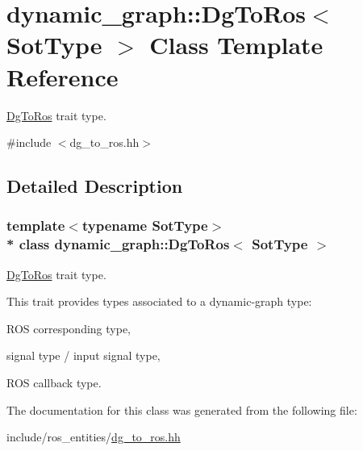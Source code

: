 \hypertarget{classdynamic__graph_1_1DgToRos}{}\section{dynamic\+\_\+graph\+:\+:Dg\+To\+Ros$<$ Sot\+Type $>$ Class Template Reference}
\label{classdynamic__graph_1_1DgToRos}


\hyperlink{classdynamic__graph_1_1DgToRos}{Dg\+To\+Ros} trait type.  




{\ttfamily \#include $<$dg\+\_\+to\+\_\+ros.\+hh$>$}



\subsection{Detailed Description}
\subsubsection*{template$<$typename Sot\+Type$>$\\*
class dynamic\+\_\+graph\+::\+Dg\+To\+Ros$<$ Sot\+Type $>$}

\hyperlink{classdynamic__graph_1_1DgToRos}{Dg\+To\+Ros} trait type. 

This trait provides types associated to a dynamic-\/graph type\+:
\begin{DoxyItemize}
\item R\+OS corresponding type,
\item signal type / input signal type,
\item R\+OS callback type. 
\end{DoxyItemize}

The documentation for this class was generated from the following file\+:\begin{DoxyCompactItemize}
\item 
include/ros\+\_\+entities/\hyperlink{dg__to__ros_8hh}{dg\+\_\+to\+\_\+ros.\+hh}\end{DoxyCompactItemize}
